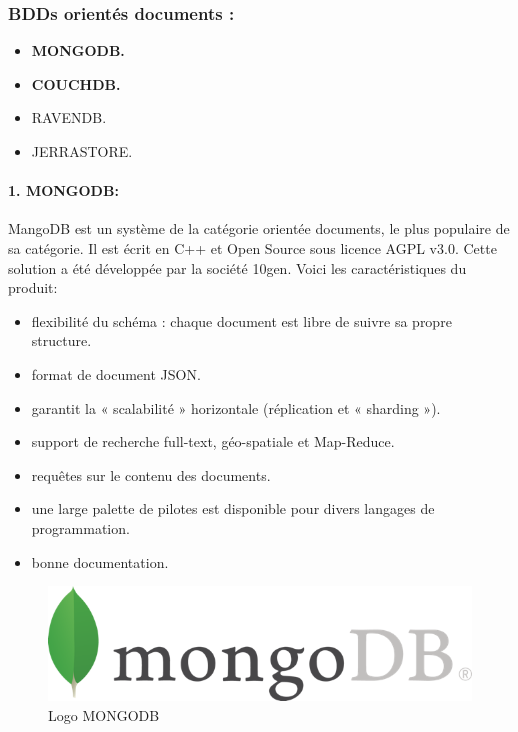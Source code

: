 \subsubsection{BDDs orientés documents :}

\begin{itemize}[label=\textbullet]
\item \textbf{MONGODB.}
\item  \textbf{COUCHDB.}
\item  RAVENDB.
\item  JERRASTORE.
\end{itemize}

\paragraph{1. MONGODB:}
MangoDB est un système de la catégorie orientée documents, le plus populaire de sa catégorie. Il est écrit en C++ et Open Source sous licence AGPL v3.0. Cette solution a été développée par la société 10gen. Voici les caractéristiques du produit:

\begin{itemize}[label=]
\item flexibilité du schéma : chaque document est libre de suivre sa propre structure.
\item format de document JSON.
\item garantit la « scalabilité » horizontale (réplication et « sharding »).
\item support de recherche full-text, géo-spatiale et Map-Reduce.
\item requêtes sur le contenu des documents.
\item une large palette de pilotes est disponible pour divers langages de programmation.
\item bonne documentation.
\end{itemize}

\begin{figure}[h]
	\centering
    \includegraphics[scale=0.3]{img/4.11}
    \caption{Logo MONGODB}
\end{figure}

